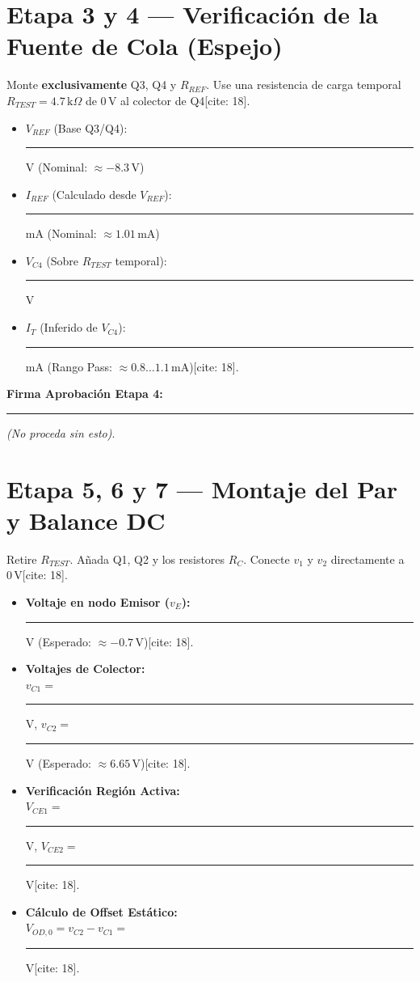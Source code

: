 \documentclass[11pt, a4paper]{article}
\begin{document}
\section*{Etapa 3 y 4 — Verificación de la Fuente de Cola (Espejo)}
Monte \textbf{exclusivamente} Q3, Q4 y $R_{REF}$. Use una resistencia de carga temporal $R_{TEST} = 4.7\,\text{k}\Omega$ de $0\,\text{V}$ al colector de Q4[cite: 18].
\begin{itemize}
    \item $V_{REF}$ (Base Q3/Q4): \rule{2cm}{0.15mm} V \quad (Nominal: $\approx -8.3\,\text{V}$)
    \item $I_{REF}$ (Calculado desde $V_{REF}$): \rule{2cm}{0.15mm} mA \quad (Nominal: $\approx 1.01\,\text{mA}$)
    \item $V_{C4}$ (Sobre $R_{TEST}$ temporal): \rule{2cm}{0.15mm} V
    \item $I_T$ (Inferido de $V_{C4}$): \rule{2cm}{0.15mm} mA \quad (Rango Pass: $\approx 0.8 \dots 1.1\,\text{mA}$)[cite: 18].
\end{itemize}
\textbf{Firma Aprobación Etapa 4:} \rule{4cm}{0.15mm} \textit{(No proceda sin esto)}.

\section*{Etapa 5, 6 y 7 — Montaje del Par y Balance DC}
Retire $R_{TEST}$. Añada Q1, Q2 y los resistores $R_C$. Conecte $v_1$ y $v_2$ directamente a $0\,\text{V}$[cite: 18].
\begin{itemize}
    \item \textbf{Voltaje en nodo Emisor ($v_E$):} \rule{2cm}{0.15mm} V \quad (Esperado: $\approx -0.7\,\text{V}$)[cite: 18].
    
    \item \textbf{Voltajes de Colector:} \\
    $v_{C1} = $ \rule{2cm}{0.15mm} V, \quad $v_{C2} = $ \rule{2cm}{0.15mm} V \quad (Esperado: $\approx 6.65\,\text{V}$)[cite: 18].
    
    \item \textbf{Verificación Región Activa:} \\
    $V_{CE1} = $ \rule{2cm}{0.15mm} V, \quad $V_{CE2} = $ \rule{2cm}{0.15mm} V[cite: 18].
    
    \item \textbf{Cálculo de Offset Estático:} \\
    $V_{OD,0} = v_{C2} - v_{C1} = $ \rule{3cm}{0.15mm} V[cite: 18].
\end{itemize}
\end{document}
